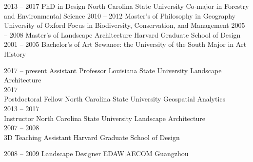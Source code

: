 \documentclass[10pt]{developercv} %
\begin{document}


\begin{entrylist}
	\entry
		{2013 -- 2017}
		{PhD in Design}
		{North Carolina State University}
		{Co-major in Forestry and Environmental Science}
	\entry
		{2010 -- 2012}
		{Master's of Philosophy in Geography} %
		{University of Oxford}
		{Focus in Biodiversity, Conservation, and Management}
	\entry
		{2005 -- 2008}
		{Master's of Landscape Architecture}
		{Harvard Graduate School of Design}
		{}
	\entry
		{2001 -- 2005}
		{Bachelor's of Art}
		{Sewanee: the University of the South}
		{Major in Art History}
\end{entrylist}



\begin{entrylist}
	\entry
		{2017 -- present}
		{Assistant Professor}
		{Louisiana State University}
		{Landscape Architecture\\
		}
	\entry
		{2017\\\footnotesize{}}
		{Postdoctoral Fellow}
		{North Carolina State University}
		{Geospatial Analytics\\
		}
	\entry
		{2013 -- 2017\\\footnotesize{}}
		{Instructor}
		{North Carolina State University}
		{Landscape Architecture\\
		}
	\entry
		{2007 -- 2008\\\footnotesize{}}
		{3D Teaching Assistant}
		{Harvard Graduate School of Design}
		{%
		}
\end{entrylist}


\begin{entrylist}
	\entry
		{2008 -- 2009}
		{Landscape Designer}
		{EDAW|AECOM Guangzhou}
		{%
		}
\end{entrylist}
\end{document}
